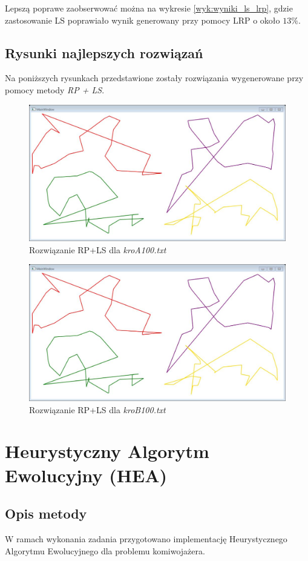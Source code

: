 \documentclass{article}
\begin{document}
Lepszą poprawe zaobserwować można na wykresie \ref{wyk:wyniki_ls_lrp}, gdzie zastosowanie LS poprawiało wynik generowany przy pomocy LRP o około $13\%$.

\subsection{Rysunki najlepszych rozwiązań}
Na poniższych rysunkach przedstawione zostały rozwiązania wygenerowane przy pomocy metody \emph{RP + LS}.
\begin{figure}[h!]
\centering\includegraphics[width=17cm]{img/rys2.png}
\caption{Rozwiązanie RP+LS dla \emph{kroA100.txt}}
\end{figure}
\begin{figure}[h!]
\centering\includegraphics[width=17cm]{img/rys3.png}
\caption{Rozwiązanie RP+LS dla \emph{kroB100.txt}}
\end{figure}


\section{Heurystyczny Algorytm Ewolucyjny (HEA)}
\subsection{Opis metody}
W ramach wykonania zadania przygotowano implementację Heurystycznego Algorytmu Ewolucyjnego dla problemu komiwojażera.
\end{document}
